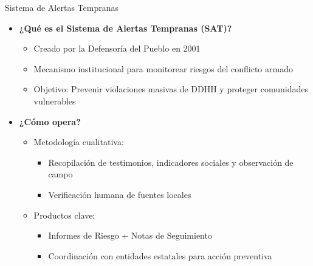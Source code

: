 \begin{frame}{Sistema de Alertas Tempranas}
    \begin{itemize}
        \item \textbf{¿Qué es el Sistema de Alertas Tempranas (SAT)?}
        \begin{itemize}
            \item Creado por la Defensoría del Pueblo en 2001
            \item Mecanismo institucional para \alert{monitorear riesgos} del conflicto armado
            \item Objetivo: Prevenir violaciones masivas de DDHH y proteger comunidades vulnerables
        \end{itemize}
        \pause
        
        \vspace{0.3cm}
        \item \textbf{¿Cómo opera?}
        \begin{itemize}
    
            \item Metodología \alert{cualitativa}:
            \begin{itemize}
            
                \item Recopilación de testimonios, indicadores sociales y observación de campo
                \item Verificación humana de fuentes locales
            \end{itemize}
            \item Productos clave:
            \begin{itemize}
            
                \item Informes de Riesgo + Notas de Seguimiento
                \item Coordinación con entidades estatales para acción preventiva
            \end{itemize}
        \end{itemize}
    \end{itemize}
    

\end{frame}